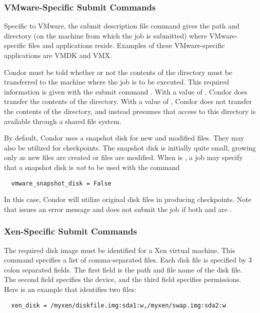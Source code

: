 \subsubsection{\label{sec:vm-VMwaresubmitfile}VMware-Specific Submit Commands}

Specific to VMware, the submit description file command
 gives the path and directory
(on the machine from which the job is submitted)
where VMware-specific files and applications reside.
Examples of these VMware-specific applications are VMDK and VMX.

Condor must be told whether or not the contents of the 
directory must be transferred to the machine where the job is
to be executed.
This required information is given with the submit command
.
With a value of ,
Condor does transfer the contents of the directory.
With a value of ,
Condor does not transfer the contents of the directory,
and instead presumes that access to this directory is
available through a shared file system.

By default, Condor uses a snapshot disk for new and modified files.
They may also be utilized for checkpoints.
The snapshot disk is initially quite small,
growing only as new files are created or files are modified.
When  is ,
a job may specify that a snapshot disk is \emph{not} to be
used with the command
\begin{verbatim}
  vmware_snapshot_disk = False
\end{verbatim}
In this case, Condor will utilize original disk files in producing
checkpoints. 
Note that  issues an error message and does not
submit the job if both 
and  are .


\subsubsection{\label{sec:vm-Xensubmitfile}Xen-Specific Submit Commands}

The required disk image must be identified for a Xen virtual machine.
This  command specifies a list of comma-separated files.
Each disk file is specified by 3 colon separated fields.
The first field is the path and file name of the disk file.
The second field specifies the device,
and the third field specifies permissions.
Here is an example that identifies two files:
\footnotesize
\begin{verbatim}
  xen_disk = /myxen/diskfile.img:sda1:w,/myxen/swap.img:sda2:w
\end{verbatim}
\normalsize


